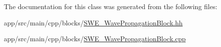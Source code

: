 The documentation for this class was generated from the following files\+:\begin{DoxyCompactItemize}
\item 
app/src/main/cpp/blocks/\hyperlink{SWE__WavePropagationBlock_8hh}{S\+W\+E\+\_\+\+Wave\+Propagation\+Block.\+hh}\item 
app/src/main/cpp/blocks/\hyperlink{SWE__WavePropagationBlock_8cpp}{S\+W\+E\+\_\+\+Wave\+Propagation\+Block.\+cpp}\end{DoxyCompactItemize}
